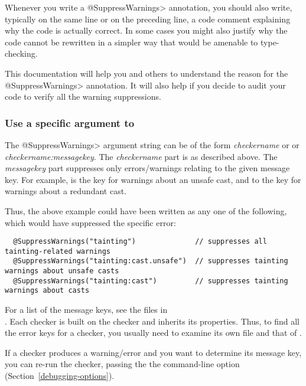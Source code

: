 Whenever you write a \<@SuppressWarnings> annotation, you should also
write, typically on the same line or on the preceding line, a code comment
explaining why the code is actually correct.  In some cases you might also
justify why the code cannot be rewritten in a simpler way that would be
amenable to type-checking.

This documentation will help you and others to understand the reason for
the \<@SuppressWarnings> annotation.  It will also help if you decide to
audit your code to verify all the warning suppressions.

\subsubsection{Use a specific argument to \label{suppresswarnings-best-practices-specific-argument}}

\label{compiler-message-keys}

The \<@SuppressWarnings> argument string can be of the form
\emph{checkername} or
or \emph{checkername:messagekey}.  The \emph{checkername} part is as
described above.  The \emph{messagekey} part suppresses only
errors/warnings relating to the given message key.  For example,
 is the key for warnings about an unsafe cast, and
 to the key for warnings about a redundant cast.

Thus, the above example could have been written as any one of the
following, which would have suppressed the specific error:

\begin{Verbatim}
  @SuppressWarnings("tainting")              // suppresses all tainting-related warnings
  @SuppressWarnings("tainting:cast.unsafe")  // suppresses tainting warnings about unsafe casts
  @SuppressWarnings("tainting:cast")         // suppresses tainting warnings about casts
\end{Verbatim}

\noindent
For a list of the message keys, 
see the  files in 
\\
.
Each checker is built on the  checker and inherits its
properties.  Thus, to find all the error keys for a checker, you usually
need to examine its own  file and that of
.

If a checker produces a warning/error and you want to determine its message
key, you can re-run the checker, passing the the 
command-line option (Section~\ref{debugging-options}).


